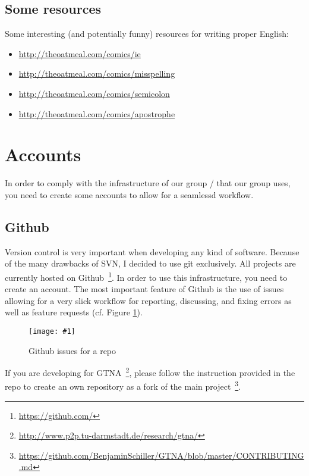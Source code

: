 \documentclass{article}
\newcommand{\img}[4]{
	\begin{figure}[!htb]
		\centering
		\texttt{[image: \#1]}
		\caption{#3}
		\label{#2}
	\end{figure}
}
\begin{document}
\subsection{Some resources}

Some interesting (and potentially funny) resources for writing proper English:
\begin{itemize}
	\item \url{http://theoatmeal.com/comics/ie}
	\item \url{http://theoatmeal.com/comics/misspelling}
	\item \url{http://theoatmeal.com/comics/semicolon}
	\item \url{http://theoatmeal.com/comics/apostrophe}
\end{itemize}














\section{Accounts}

In order to comply with the infrastructure of our group / that our group uses, you need to create some accounts to allow for a seamlessd workflow.


\subsection{Github}

Version control is very important when developing any kind of software.
Because of the many drawbacks of SVN, I decided to use git exclusively.
All projects are currently hosted on Github~\footnote{\url{https://github.com/}}.
In order to use this infrastructure, you need to create an account.
The most important feature of Github is the use of issues allowing for a very slick workflow for reporting, discussing, and fixing errors as well as feature requests (cf. Figure \ref{fig:github}).

\img{github}{fig:github}{Github issues for a repo}{0.6}

If you are developing for GTNA~\footnote{\url{http://www.p2p.tu-darmstadt.de/research/gtna/}}, please follow the instruction provided in the repo to create an own repository as a fork of the main project~\footnote{\url{https://github.com/BenjaminSchiller/GTNA/blob/master/CONTRIBUTING.md}}.
\end{document}
